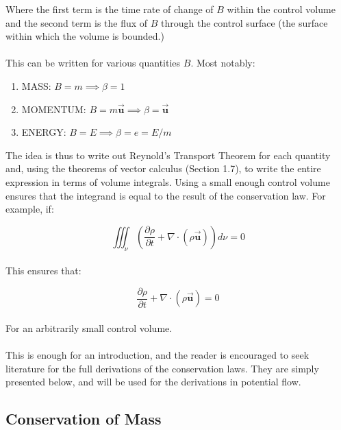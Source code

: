 \documentclass[11pt]{article}
\begin{document}
\noindent
Where the first term is the time rate of change of $B$ within the control volume and the second term is the flux of $B$ through the control surface (the surface within which the volume is bounded.) \\ \\
This can be written for various quantities $B$. Most notably:
\begin{enumerate}
    \item MASS: $B = m \implies \beta = 1$ \\
    \item MOMENTUM: $B = m\vec{\bm{u}} \implies \beta = \vec{\bm{u}}$ \\
    \item ENERGY: $B = E \implies \beta = e = E/m$ \\
\end{enumerate}
The idea is thus to write out Reynold's Transport Theorem for each quantity and, using the theorems of vector calculus (Section 1.7), to write the entire expression in terms of volume integrals. Using a small enough control volume ensures that the integrand is equal to the result of the conservation law. For example, if:

\begin{equation*}
    \iiint_{\nu}(\frac{\partial\rho}{\partial t} + \nabla \cdot (\rho\vec{\bm{u}}))d\nu = 0
\end{equation*}\\
\noindent
This ensures that:

\begin{equation*}
    \frac{\partial\rho}{\partial t} + \nabla \cdot (\rho\vec{\bm{u}}) = 0
\end{equation*}\\
\noindent
For an arbitrarily small control volume.\\ \\
\noindent
This is enough for an introduction, and the reader is encouraged to seek literature for the full derivations of the conservation laws. They are simply presented below, and will be used for the derivations in potential flow.

\subsection{Conservation of Mass}



\end{document}
